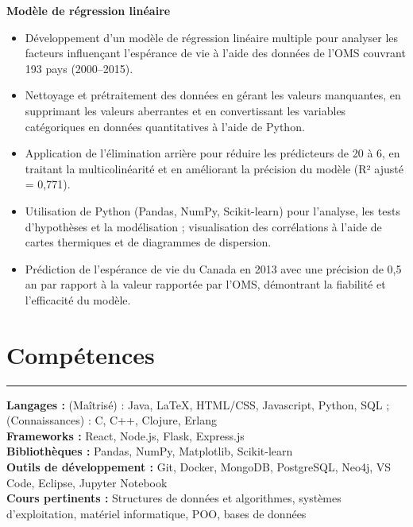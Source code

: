 \documentclass[10pt]{article}
\begin{document}
\textbf{Modèle de régression linéaire} 
\vspace{-4mm}
\begin{itemize}[left=0.15in, itemsep=0pt, label=--]
    \item Développement d'un modèle de régression linéaire multiple pour analyser les facteurs influençant l'espérance de vie à l'aide des données de l'OMS couvrant 193 pays (2000–2015).
    \item Nettoyage et prétraitement des données en gérant les valeurs manquantes, en supprimant les valeurs aberrantes et en convertissant les variables catégoriques en données quantitatives à l'aide de Python.
    \item Application de l'élimination arrière pour réduire les prédicteurs de 20 à 6, en traitant la multicolinéarité et en améliorant la précision du modèle (R² ajusté = 0,771).
    \item Utilisation de Python (Pandas, NumPy, Scikit-learn) pour l'analyse, les tests d'hypothèses et la modélisation ; visualisation des corrélations à l'aide de cartes thermiques et de diagrammes de dispersion.
    \item Prédiction de l'espérance de vie du Canada en 2013 avec une précision de 0,5 an par rapport à la valeur rapportée par l'OMS, démontrant la fiabilité et l'efficacité du modèle.
\end{itemize}

\section*{Compétences}
\vspace{-2mm}
\hrule
\vspace{0mm}
\textbf{Langages :} (Maîtrisé) : Java, LaTeX, HTML/CSS, Javascript, Python, SQL ; (Connaissances) : C, C++, Clojure, Erlang \\
\textbf{Frameworks :} React, Node.js, Flask, Express.js  \\
\textbf{Bibliothèques :} Pandas, NumPy, Matplotlib, Scikit-learn \\
\textbf{Outils de développement :} Git, Docker, MongoDB, PostgreSQL, Neo4j, VS Code, Eclipse, Jupyter Notebook \\
\textbf{Cours pertinents :} Structures de données et algorithmes, systèmes d'exploitation, matériel informatique, POO, bases de données
\end{document}

